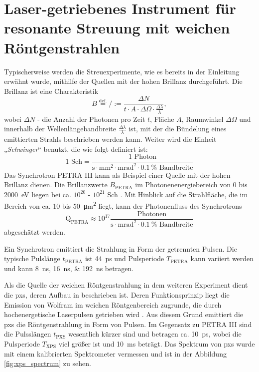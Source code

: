 \chapter{Laser-getriebenes Instrument für resonante Streuung mit weichen Röntgenstrahlen}
\label{text:quelle_roentgen}
Typischerweise werden die Streuexperimente, wie es bereits in der Einleitung erwähnt wurde, mithilfe der Quellen mit der hohen Brillanz durchgeführt. Die Brillanz ist eine Charakteristik
\begin{equation}
    B \stackrel{\text{def.}}{=} / := \frac{\Delta N}{t\cdot A \cdot \Delta \Omega \cdot \frac{\Delta \lambda}{\lambda}},
\end{equation}
wobei $\Delta N$ - die Anzahl der Photonen pro Zeit $t$, Fläche $A$, Raumwinkel $\Delta \Omega$ und innerhalb der Wellenlängebandbreite $\frac{\Delta \lambda}{\lambda}$ ist, mit der die Bündelung eines emittierten Strahls beschrieben werden kann. Weiter wird die Einheit „\emph{Schwinger}“ benutzt, die wie folgt definiert ist:
\begin{equation}
    1 \text{ Sch} = \frac{1 \text{ Photon}}{\si{\second}\cdot \si{\milli\meter\squared}\cdot \si{\milli\radian\squared}\cdot\SI{0,1}{\percent}\text{ Bandbreite}}
\end{equation}
Das Synchrotron PETRA III kann als Beispiel einer Quelle mit der hohen Brillanz dienen. Die Brillanzwerte $B_\text{PETRA}$ im Photonenenergiebereich von 0 bis \SI{2000}{\eV} liegen bei ca. $10^{20}$ - $10^{21}$ Sch \cite[Abb. 1]{franz_technical_2006}. Mit Hinblick auf die Strahlfläche, die im Bereich von ca. 10 bis \SI{50}{\micro\meter\squared} liegt, \cite{viefhaus_variable_2013} kann der Photonenfluss des Synchrotrons
\begin{equation}
    \text{Q}_\text{PETRA} \approx 10^{17} \frac{\text{Photonen}}{\si{\second}\cdot\si{\milli\radian\squared}\cdot\SI{0,1}{\percent}\text{ Bandbreite}}
\end{equation}
abgeschätzt werden.

\noindent
Ein Synchrotron emittiert die Strahlung in Form der getrennten Pulsen. Die typische Pulslänge $t_\text{PETRA}$ ist \SI{44}{\pico\second} und Pulsperiode $T_\text{PETRA}$ kann variiert werden und kann \qtylist{8;16;192}{\nano\second} \cite{petra-values-website} betragen.

\noindent
Als die Quelle der weichen Röntgenstrahlung in dem weiteren Experiment dient die \gls{pxs}, deren Aufbau in \cite{schick_laser-driven_2021} beschrieben ist. Deren Funktionsprinzip liegt die Emission von Wolfram im weichen Röntgenbereich zugrunde, die durch hochenergetische Laserpulsen getrieben wird \cite{mantouvalou_high_2015}. Aus diesem Grund emittiert die \gls{pxs} die Röntgenstrahlung in Form von Pulsen. Im Gegensatz zu PETRA III sind die Pulsslängen $t_\text{PXS}$ wesentlich kürzer sind und betragen ca. \SI{10}{\pico\second}, wobei die Pulsperiode $T_\text{XPS}$ viel größer ist und \SI{10}{\milli\second} beträgt. Das Spektrum von \gls{pxs} wurde mit einem kalibrierten Spektrometer vermessen und ist in der Abbildung \ref{fig:xps_spectrum} zu sehen.

